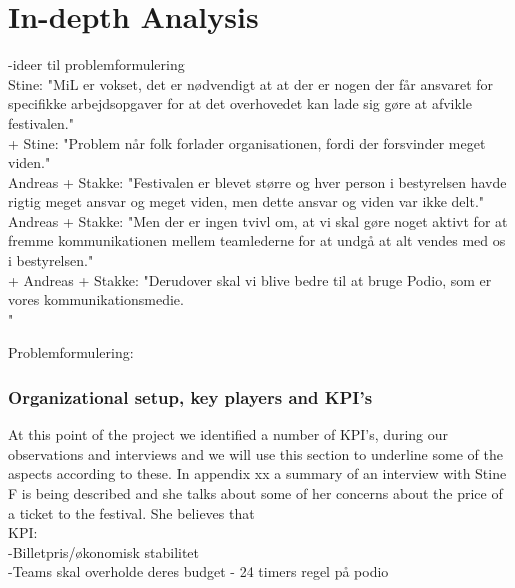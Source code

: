 \part{In-depth Analysis}

-ideer til problemformulering\\
Stine: "MiL er vokset, det er nødvendigt at at der er nogen der får ansvaret for specifikke arbejdsopgaver for at det overhovedet kan lade sig gøre at afvikle festivalen."\\
+ Stine: "Problem når folk forlader organisationen, fordi der forsvinder meget viden."\\

Andreas + Stakke: "Festivalen er blevet større og hver person i bestyrelsen havde rigtig meget ansvar og meget viden, men dette ansvar og viden var ikke delt."\\

Andreas + Stakke: "Men der er ingen tvivl om, at vi skal gøre noget aktivt for at fremme kommunikationen mellem teamlederne for at undgå at alt vendes med os i bestyrelsen."\\

+ Andreas + Stakke: "Derudover skal vi blive bedre til at bruge Podio, som er vores kommunikationsmedie.\\"

Problemformulering:\\


\section{Organizational setup, key players and KPI's}
At this point of the project we identified a number of KPI's, during our observations and interviews and we will use this section to underline some of the aspects according to these.
In appendix xx a summary of an interview with Stine F is being described and she talks about some of her concerns about the price of a ticket to the festival. She believes that \\
KPI:\\
-Billetpris/økonomisk stabilitet\\
-Teams skal overholde deres budget
- 24 timers regel på podio
